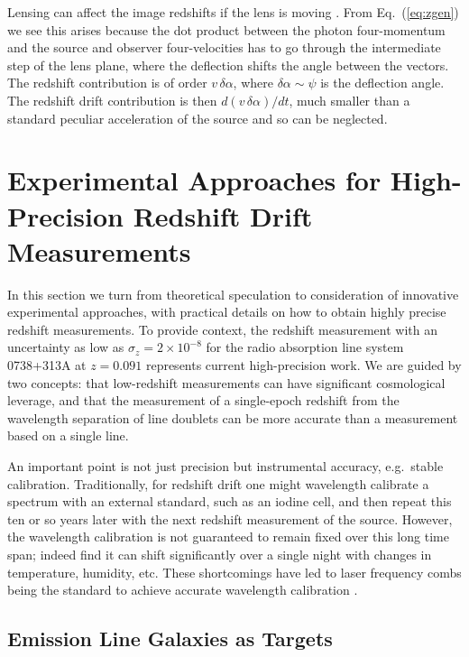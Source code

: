 \documentclass[preprint2, 10pt]{aastex}
\begin{document}
{Lensing can affect the image redshifts if the lens is moving 
\citep{mitrofanov,birkgull}.  From 
Eq.~(\ref{eq:zgen}) we see this arises because the dot product between 
the photon four-momentum and the source and observer four-velocities 
has to go through the intermediate step of the lens plane, where the 
deflection shifts the angle between the vectors.  The redshift contribution 
is of order $v\,\delta\alpha$, where $\delta\alpha\sim\psi$ is the 
deflection angle.  The redshift drift contribution is then 
$d(v\,\delta\alpha)/dt$, much smaller than a standard peculiar 
acceleration of the source and so can be neglected. 



\section{Experimental Approaches for High-Precision Redshift Drift Measurements} \label{sec:tech} 

In this section we turn from theoretical speculation to consideration of 
innovative experimental approaches, with practical details on how to 
obtain highly precise redshift measurements. 
To provide context, the redshift measurement with an uncertainty as low as 
$\sigma_z=2\times 10^{-8}$ for the radio absorption line system 0738+313A at $z=0.091$
\citep{2012ApJ...761L..26D} represents current high-precision 
work.
We are guided by two concepts: 
that low-redshift measurements can have significant cosmological leverage, 
and that the measurement of a single-epoch redshift from the wavelength separation
of line doublets can be more accurate than a measurement based on a single line.

An important point is not just precision but instrumental accuracy, 
e.g.\ stable calibration. 
Traditionally, for redshift drift one might wavelength calibrate a spectrum with an external 
standard, such as an iodine cell, and then repeat this ten or so years 
later with the next redshift measurement of the source.  However, the 
wavelength calibration is not guaranteed to remain fixed over this long time 
span; indeed \citet{griest1,griest2} find it can shift significantly over a 
single night with changes in temperature, humidity, etc.  
These shortcomings have led to 
laser frequency combs being the standard to achieve accurate wavelength calibration
\citep{2007MNRAS.380..839M,2008Sci...321.1335S,2012Natur.485..611W}.

\subsection{Emission Line Galaxies as Targets} 

}
\end{document}
